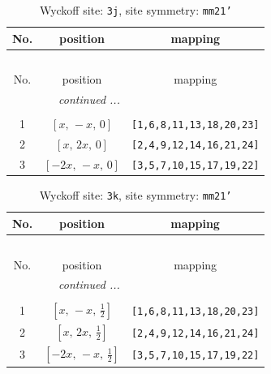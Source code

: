 \documentclass[fleqn,8pt]{jsarticle}
\begin{document}
\begin{longtable}{ccc}
\caption{Wyckoff site: {\tt 3j}, site symmetry: {\tt mm21'}}
 \\
 \hline \hline
No. & position & mapping \\ \hline \endfirsthead

\multicolumn{2}{l}{\tablename\ \thetable{}} \\
 \hline \hline
No. & position & mapping \\ \hline \endhead

 \hline \hline
\multicolumn{2}{r}{\footnotesize\it continued ...} \\ \endfoot

 \hline \hline
\multicolumn{2}{r}{} \\ \endlastfoot

1 & $\left[ x,\, - x,\, 0 \right]$ & {\tt [1,6,8,11,13,18,20,23]} \\ \hline
2 & $\left[ x,\, 2 x,\, 0 \right]$ & {\tt [2,4,9,12,14,16,21,24]} \\ \hline
3 & $\left[ - 2 x,\, - x,\, 0 \right]$ & {\tt [3,5,7,10,15,17,19,22]} \\
\end{longtable}
\renewcommand{\arraystretch}{1.2}
\begin{longtable}{ccc}
\caption{Wyckoff site: {\tt 3k}, site symmetry: {\tt mm21'}}
 \\
 \hline \hline
No. & position & mapping \\ \hline \endfirsthead

\multicolumn{2}{l}{\tablename\ \thetable{}} \\
 \hline \hline
No. & position & mapping \\ \hline \endhead

 \hline \hline
\multicolumn{2}{r}{\footnotesize\it continued ...} \\ \endfoot

 \hline \hline
\multicolumn{2}{r}{} \\ \endlastfoot

1 & $\left[ x,\, - x,\, \frac{1}{2} \right]$ & {\tt [1,6,8,11,13,18,20,23]} \\ \hline
2 & $\left[ x,\, 2 x,\, \frac{1}{2} \right]$ & {\tt [2,4,9,12,14,16,21,24]} \\ \hline
3 & $\left[ - 2 x,\, - x,\, \frac{1}{2} \right]$ & {\tt [3,5,7,10,15,17,19,22]} \\
\end{longtable}
\renewcommand{\arraystretch}{1.2}
\end{document}
